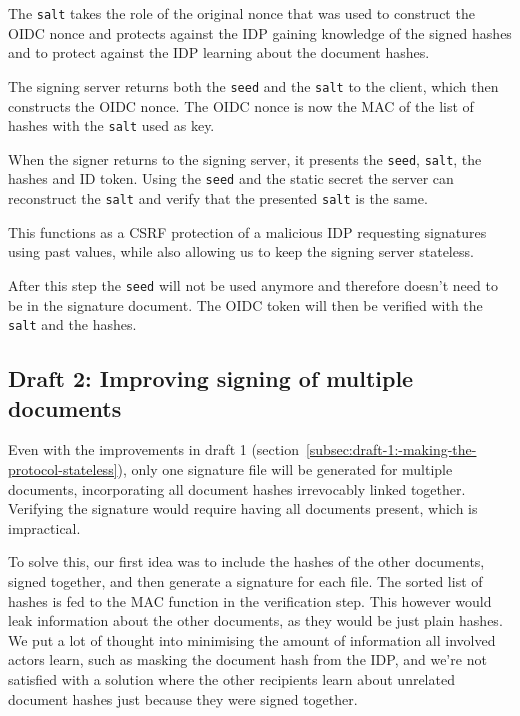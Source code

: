 The \texttt{salt} takes the role of the original nonce that was used to construct the \gls{OIDC} nonce and protects against the \gls{IDP} gaining knowledge of the signed hashes and to protect against the \gls{IDP} learning about the document hashes.

The signing server returns both the \texttt{seed} and the \texttt{salt} to the client,
which then constructs the \gls{OIDC} nonce.
The \gls{OIDC} nonce is now the \gls{MAC} of the list of hashes with the \texttt{salt} used as key.

When the signer returns to the signing server, it presents the \texttt{seed}, \texttt{salt}, the hashes and ID token.
Using the \texttt{seed} and the static secret the server can reconstruct the \texttt{salt} and verify that the presented \texttt{salt} is the same.

This functions as a \gls{CSRF} protection of a malicious \gls{IDP} requesting signatures using past values,
while also allowing us to keep the signing server stateless.

After this step the \texttt{seed} will not be used anymore and therefore doesn't need to be in the signature document.
The \gls{OIDC} token will then be verified with the \texttt{salt} and the hashes.

\subsection{Draft 2: Improving signing of multiple documents}\label{subsec:draft-2:-improving-signing-of-multiple-documents}
Even with the improvements in draft 1 (section~\ref{subsec:draft-1:-making-the-protocol-stateless}),
only one signature file will be generated for multiple documents, incorporating all document hashes irrevocably linked together.
Verifying the signature would require having all documents present, which is impractical.

To solve this, our first idea was to include the hashes of the other documents, signed together,
and then generate a signature for each file.
The sorted list of hashes is fed to the \gls{MAC} function in the verification step.
This however would leak information about the other documents, as they would be just plain hashes.
We put a lot of thought into minimising the amount of information all involved actors learn,
such as masking the document hash from the \gls{IDP}, and we're not satisfied with a solution where the other recipients learn
about unrelated document hashes just because they were signed together.

